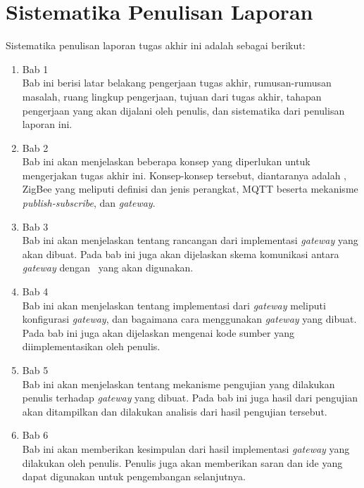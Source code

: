 \section{Sistematika Penulisan Laporan}
Sistematika penulisan laporan tugas akhir ini adalah sebagai berikut:
\begin{enumerate}
	\item Bab 1 \babSatu \\
	Bab ini berisi latar belakang pengerjaan tugas akhir, rumusan-rumusan masalah, ruang lingkup pengerjaan, tujuan dari tugas akhir, tahapan pengerjaan yang akan dijalani oleh penulis, dan sistematika dari penulisan laporan ini.
	\item Bab 2 \babDua \\
	Bab ini akan menjelaskan beberapa konsep yang diperlukan untuk mengerjakan tugas akhir ini. Konsep-konsep tersebut, diantaranya adalah \iot, ZigBee yang meliputi definisi dan jenis perangkat,  MQTT beserta mekanisme \textit{publish-subscribe}, dan \textit{gateway}.
	\item Bab 3 \babTiga \\
	Bab ini akan menjelaskan tentang rancangan dari implementasi \textit{gateway} yang akan dibuat. Pada bab ini juga akan dijelaskan skema komunikasi antara \textit{gateway} dengan \plat~yang akan digunakan.
	\item Bab 4 \babEmpat \\
	Bab ini akan menjelaskan tentang implementasi dari \textit{gateway} meliputi konfigurasi \textit{gateway}, dan bagaimana cara menggunakan \textit{gateway} yang dibuat. Pada bab ini juga akan dijelaskan mengenai kode sumber yang diimplementasikan oleh penulis.
	\item Bab 5 \babLima \\
	Bab ini akan menjelaskan tentang mekanisme pengujian yang dilakukan penulis terhadap \textit{gateway} yang dibuat. Pada bab ini juga hasil dari pengujian akan ditampilkan dan dilakukan analisis dari hasil pengujian tersebut.
	\item Bab 6 \kesimpulan \\
	Bab ini akan memberikan kesimpulan dari hasil implementasi \textit{gateway} yang dilakukan oleh penulis. Penulis juga akan memberikan saran dan ide yang dapat digunakan untuk pengembangan selanjutnya.
\end{enumerate}

